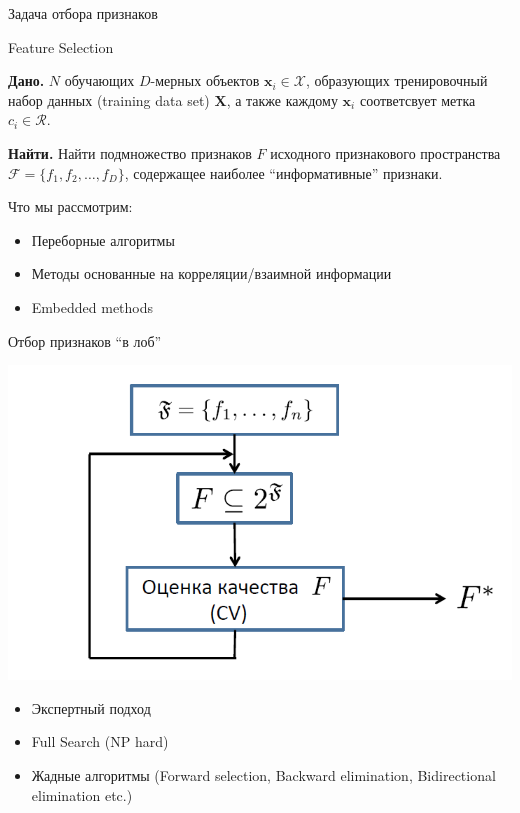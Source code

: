 \documentclass[10pt]{beamer}
\begin{document}
\begin{frame}{Задача отбора признаков}
\begin{block}{Feature Selection}
\end{block}

{\bf Дано.} $N$ обучающих $D$-мерных объектов $\mathbf{x}_i \in \mathcal{X}$,
образующих тренировочный набор данных (training data set) $\mathbf{X}$, а также каждому
$\mathbf{x}_i$ соответсвует метка $c_i \in \mathcal{R}$.

\vspace{1em}
{\bf Найти.} Найти подмножество признаков $F$ исходного признакового пространства
$\mathcal{F} = \{f_1, f_2, \ldots, f_D \}$, содержащее наиболее ``информативные'' признаки.

\vspace{1em}
Что мы рассмотрим:
\begin{itemize}
    \item Переборные алгоритмы
    \item Методы основанные на корреляции/взаимной информации
    \item Embedded methods
\end{itemize}

\end{frame}

\begin{frame}{Отбор признаков ``в лоб''}
\begin{center}
    \includegraphics[scale=0.3]{images/featureselection.png}
\end{center}
\begin{itemize}
    \item Экспертный подход
    \item Full Search (NP hard)
    \item Жадные алгоритмы (Forward selection, Backward elimination, Bidirectional
            elimination etc.)
\end{itemize}
\end{frame}
\end{document}

